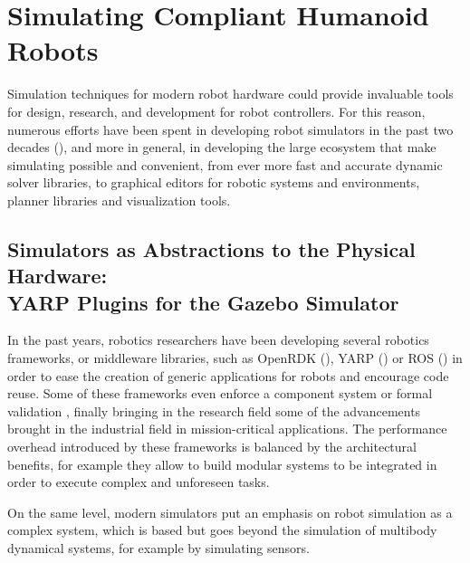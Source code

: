 \section{Simulating Compliant Humanoid Robots}
Simulation techniques for modern robot hardware could provide invaluable tools for design, research, and development for robot controllers.
For this reason, numerous efforts have been spent in developing robot simulators in the past two decades (\cite{DBLP:journals/corr/IvaldiPN14}), and more in general, in developing the large ecosystem that make simulating possible and convenient, from ever more fast and accurate dynamic solver libraries, to graphical editors for robotic systems and environments, planner libraries and visualization tools.

\subsection{Simulators as Abstractions to the Physical Hardware:\\YARP Plugins for the Gazebo Simulator}

In the past years, robotics researchers have been developing several robotics frameworks, or middleware libraries, such as OpenRDK (\cite{cace08rdk}), YARP (\cite{Metta:YARP:2006}) or ROS (\cite{ROS}) in order to ease the creation of generic applications for robots and encourage code reuse. Some of these frameworks even enforce a component system  or formal validation , finally bringing in the research field some of the advancements brought in the industrial field in mission-critical applications. The performance overhead introduced by these frameworks is balanced by the architectural benefits, for example they allow to build modular systems to be integrated in order to execute complex and unforeseen tasks.

On the same level, modern simulators put an emphasis on robot simulation as a complex system, which is based but goes beyond the simulation of multibody dynamical systems, for example by simulating sensors.

